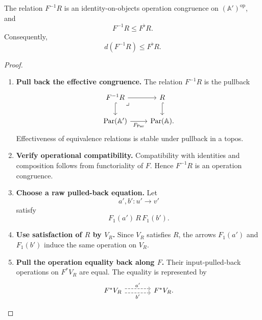 \begin{proposition}
\label{prop:to-raw-pullback-contained}
    The relation \(F^{-1}R\) is an identity-on-objects operation congruence on
    \((\mathbb A')^{\mathrm{op}}\), and
    \[
        F^{-1}R
        \leq
        F^\flat R.
    \]
    Consequently,
    \[
        d(F^{-1}R)
        \leq
        F^\flat R.
    \]
\end{proposition}

\begin{proof}
    \leavevmode
    \begin{enumerate}
        \item \textbf{Pull back the effective congruence.}
        The relation \(F^{-1}R\) is the pullback
        \[
        \begin{tikzcd}
            F^{-1}R
                \arrow[r]
                \arrow[d, hook]
                \arrow[dr, phantom, "\lrcorner", very near start]
            &
            R
                \arrow[d, hook]
            \\
            \operatorname{Par}(\mathbb A')
                \arrow[r, "F_{\operatorname{Par}}"']
            &
            \operatorname{Par}(\mathbb A).
        \end{tikzcd}
        \]
        Effectiveness of equivalence relations is stable under pullback in a
        topos.

        \item \textbf{Verify operational compatibility.}
        Compatibility with identities and composition follows from
        functoriality of \(F\). Hence \(F^{-1}R\) is an operation congruence.

        \item \textbf{Choose a raw pulled-back equation.}
        Let
        \[
            a',b':u'\to v'
        \]
        satisfy
        \[
            F_1(a')\,R\,F_1(b').
        \]

        \item \textbf{Use satisfaction of \(R\) by \(V_R\).}
        Since \(V_R\) satisfies \(R\), the arrows \(F_1(a')\) and \(F_1(b')\)
        induce the same operation on \(V_R\).

        \item \textbf{Pull the operation equality back along \(F\).}
        Their input-pulled-back operations on \(F^*V_R\) are equal. The
        equality is represented by
        \[
        \begin{tikzcd}[column sep=large]
            F^*V_R
                \arrow[r, shift left=.7ex, dashed, "a'"]
                \arrow[r, shift right=.7ex, dashed, "b'"']
            &
            F^*V_R.
        \end{tikzcd}
        \]


\end{enumerate}
\end{proof}

